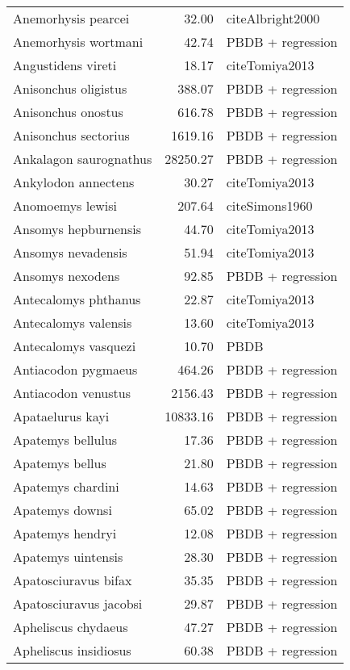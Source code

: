 \begin{table}[ht]
\begin{tabular}{lrl}
  Anemorhysis pearcei & 32.00 & cite{Albright2000} \\ 
  Anemorhysis wortmani & 42.74 & PBDB + regression \\ 
  Angustidens vireti & 18.17 & cite{Tomiya2013} \\ 
  Anisonchus oligistus & 388.07 & PBDB + regression \\ 
  Anisonchus onostus & 616.78 & PBDB + regression \\ 
  Anisonchus sectorius & 1619.16 & PBDB + regression \\ 
  Ankalagon saurognathus & 28250.27 & PBDB + regression \\ 
  Ankylodon annectens & 30.27 & cite{Tomiya2013} \\ 
  Anomoemys lewisi & 207.64 & cite{Simons1960} \\ 
  Ansomys hepburnensis & 44.70 & cite{Tomiya2013} \\ 
  Ansomys nevadensis & 51.94 & cite{Tomiya2013} \\ 
  Ansomys nexodens & 92.85 & PBDB + regression \\ 
  Antecalomys phthanus & 22.87 & cite{Tomiya2013} \\ 
  Antecalomys valensis & 13.60 & cite{Tomiya2013} \\ 
  Antecalomys vasquezi & 10.70 & PBDB \\ 
  Antiacodon pygmaeus & 464.26 & PBDB + regression \\ 
  Antiacodon venustus & 2156.43 & PBDB + regression \\ 
  Apataelurus kayi & 10833.16 & PBDB + regression \\ 
  Apatemys bellulus & 17.36 & PBDB + regression \\ 
  Apatemys bellus & 21.80 & PBDB + regression \\ 
  Apatemys chardini & 14.63 & PBDB + regression \\ 
  Apatemys downsi & 65.02 & PBDB + regression \\ 
  Apatemys hendryi & 12.08 & PBDB + regression \\ 
  Apatemys uintensis & 28.30 & PBDB + regression \\ 
  Apatosciuravus bifax & 35.35 & PBDB + regression \\ 
  Apatosciuravus jacobsi & 29.87 & PBDB + regression \\ 
  Apheliscus chydaeus & 47.27 & PBDB + regression \\ 
  Apheliscus insidiosus & 60.38 & PBDB + regression \\ 

\end{tabular}
\end{table}
